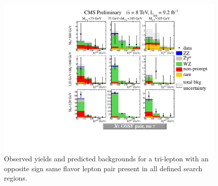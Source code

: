 \begin{figure}[htp]
\begin{center}
\includegraphics[width=1.0\textwidth]{plots/3lfinal/ossf1tau0.pdf}
\caption{Observed yields and predicted backgrounds for a tri-lepton with an opposite sign same flavor 
lepton pair present in all defined search regions.}
\label{fig:OSSF1tau0}
\end{center}
\end{figure}
